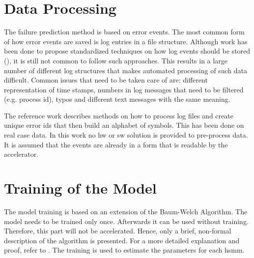 \documentclass[mscthesis]{usiinfthesis}
\begin{document}
\section{Data Processing}
\label{ch:event_data}

The failure prediction method is based on error events. The most common form of
how error events are saved is log entries in a file structure. Although work
has been done to propose standardized techniques on how log events should be
stored (\cite{IPDPS04_Salfner, DSN09_Ziming}), it is still not common to
follow such approaches. This results in a large number of different log
structures that makes automated processing of such data difficult. Common
issues that need to be taken care of are: different representation of time
stamps, numbers in log messages that need to be filtered (e.g. process id),
typos and different text messages with the same meaning.

The reference work \cite{salfner08} describes methods on how to process log
files and create unique error ids that then build an alphabet of symbols. This
has been done on real case data. In this work no \gls{hw} or \gls{sw} solution
is provided to pre-process data. It is assumed that the events are already in
a form that is readable by the accelerator.

\section{Training of the Model}
\label{ch:event_train}

The model training is based on an extension of the Baum-Welch Algorithm. The
model needs to be trained only once. Afterwards it can be used without
training.  Therefore, this part will not be accelerated. Hence, only a brief,
non-formal description of the algorithm is presented. For a more detailed
explanation and proof, refer to \cite{salfner08}. The training is used to
estimate the parameters for each \gls{hsmm}.
\end{document}
